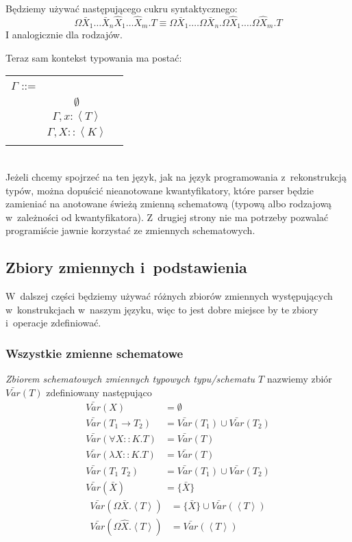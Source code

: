 \documentclass[11pt,leqno]{article}
\begin{document}
Będziemy używać następującego cukru syntaktycznego:
\[
\Omega \bar{X}_1 \dots \bar{X}_n \widehat{X}_1 \dots \widehat{X}_m.T \equiv 
\Omega \bar{X}_1. \dots \Omega \bar{X}_n. \Omega \widehat{X}_1. \dots \Omega \widehat{X}_m.T
\]
I analogicznie dla rodzajów.

Teraz sam kontekst typowania ma postać:

\begin{tabular}{| l c r |}
  \hline
  $\Gamma$ ::= &  & \\
   & $\emptyset$ & \\
   & $\Gamma, x:\left<T\right>$ & \\
   & $\Gamma, X::\left<K\right>$ & \\
   & & \\
  \hline
\end{tabular} \\

Jeżeli chcemy spojrzeć na ten język, jak na język programowania z~rekonstrukcją typów, można
dopuścić nieanotowane kwantyfikatory, które parser będzie zamieniać na anotowane świeżą zmienną schematową 
(typową albo rodzajową w~zależności od kwantyfikatora). Z~drugiej strony nie ma potrzeby pozwalać programiście
jawnie korzystać ze zmiennych schematowych.

\subsection{Zbiory zmiennych i~podstawienia}

W~dalszej części będziemy używać różnych zbiorów zmiennych występujących w~konstrukcjach w~naszym języku, więc
to jest dobre miejsce by te zbiory i~operacje zdefiniować.

\subsubsection{Wszystkie zmienne schematowe}

\begin{definicja}
\emph{Zbiorem schematowych zmiennych typowych typu/schematu $T$} nazwiemy zbiór $\bar{Var}(T)$ zdefiniowany następująco
\begin{align*}
\bar{Var}(X) & = \emptyset \\
\bar{Var}(T_1 \to T_2) & = \bar{Var}(T_1) \cup \bar{Var}(T_2) \\
\bar{Var}(\forall X :: K.T) & = \bar{Var}(T) \\
\bar{Var}(\lambda X :: K.T) & = \bar{Var}(T) \\
\bar{Var}(T_1 \; T_2) & = \bar{Var}(T_1) \cup \bar{Var}(T_2) \\
\bar{Var}(\bar{X}) & = \{ \bar{X} \}
\end{align*}
\begin{align*}
\bar{Var}(\Omega \bar{X}.\left<T\right>) & = \{ \bar{X} \} \cup \bar{Var}(\left<T\right>) \\
\bar{Var}(\Omega \widehat{X}.\left<T\right>) & = \bar{Var}(\left<T\right>)
\end{align*}
\end{definicja}
\end{document}
